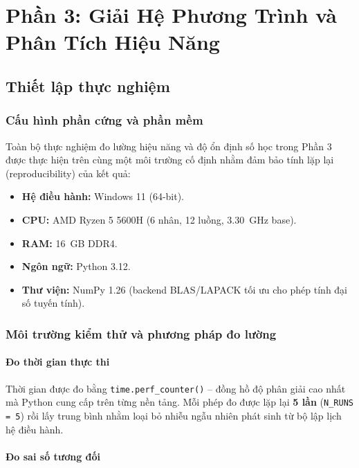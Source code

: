 \section{Phần 3: Giải Hệ Phương Trình và Phân Tích Hiệu Năng}

\subsection{Thiết lập thực nghiệm}

\subsubsection{Cấu hình phần cứng và phần mềm}

Toàn bộ thực nghiệm đo lường hiệu năng và độ ổn định số học trong Phần 3 được thực hiện trên cùng một môi trường cố định nhằm đảm bảo tính lặp lại (reproducibility) của kết quả:

\begin{itemize}
    \item \textbf{Hệ điều hành:} Windows 11 (64-bit).
    \item \textbf{CPU:} AMD Ryzen 5 5600H (6 nhân, 12 luồng, 3.30~GHz base).
    \item \textbf{RAM:} 16~GB DDR4.
    \item \textbf{Ngôn ngữ:} Python 3.12.
    \item \textbf{Thư viện:} NumPy 1.26 (backend BLAS/LAPACK tối ưu cho phép tính đại số tuyến tính).
\end{itemize}

\subsubsection{Môi trường kiểm thử và phương pháp đo lường}

\paragraph{Đo thời gian thực thi}

Thời gian được đo bằng \texttt{time.perf\_counter()} -- đồng hồ độ phân giải cao nhất mà Python cung cấp trên từng nền tảng. Mỗi phép đo được lặp lại \textbf{5 lần} (\texttt{N\_RUNS = 5}) rồi lấy trung bình nhằm loại bỏ nhiễu ngẫu nhiên phát sinh từ bộ lập lịch hệ điều hành.

\paragraph{Đo sai số tương đối}

